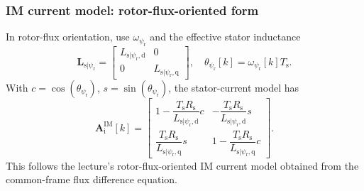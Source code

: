 \begin{frame}
	\frametitle{IM current model: rotor-flux-oriented form}
	In rotor-flux orientation, use $\omega_{\psi_{\mathrm{r}}}$ and the effective stator inductance
	\begin{equation*}
		\bm{L}_{\mathrm{s}|\psi_{\mathrm{r}}}
		=\begin{bmatrix}L_{\mathrm{s}|\psi_{\mathrm{r}},\mathrm{d}}&0\\0&L_{\mathrm{s}|\psi_{\mathrm{r}},\mathrm{q}}\end{bmatrix},
		\quad
		\theta_{\psi_{\mathrm{r}}}[k]=\omega_{\psi_{\mathrm{r}}}[k]T_{\mathrm{s}}.
	\end{equation*}\pause%
	With $c=\cos(\theta_{\psi_{\mathrm{r}}})$, $s=\sin(\theta_{\psi_{\mathrm{r}}})$, the stator-current model has
	\begin{equation*}
		\bm{A}_{\mathrm{i}}^{\mathrm{IM}}[k]=
		\begin{bmatrix}
			1-\dfrac{T_{\mathrm{s}}R_{\mathrm{s}}}{L_{\mathrm{s}|\psi_{\mathrm{r}},\mathrm{d}}}c &
			-\dfrac{T_{\mathrm{s}}R_{\mathrm{s}}}{L_{\mathrm{s}|\psi_{\mathrm{r}},\mathrm{d}}}s    \\[4mm]
			\dfrac{T_{\mathrm{s}}R_{\mathrm{s}}}{L_{\mathrm{s}|\psi_{\mathrm{r}},\mathrm{q}}}s   &
			1-\dfrac{T_{\mathrm{s}}R_{\mathrm{s}}}{L_{\mathrm{s}|\psi_{\mathrm{r}},\mathrm{q}}}c
		\end{bmatrix}.
	\end{equation*}
	This follows the lecture's rotor-flux-oriented IM current model obtained from the common-frame flux difference equation.
\end{frame}

